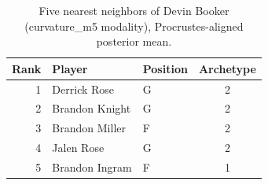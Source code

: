 \begin{table}[htbp]
  \centering\small
  \begin{tabular}{rllc}
    \toprule
    Rank & Player & Position & Archetype \\
    \midrule
    1 & Derrick Rose & G & 2 \\
    2 & Brandon Knight & G & 2 \\
    3 & Brandon Miller & F & 2 \\
    4 & Jalen Rose & G & 2 \\
    5 & Brandon Ingram & F & 1 \\
    \bottomrule
  \end{tabular}
  \caption{Five nearest neighbors of Devin Booker (curvature_m5 modality), Procrustes-aligned posterior mean.}
  \label{tab:Devin_Booker_neighbors_curvature_m5}
\end{table}

